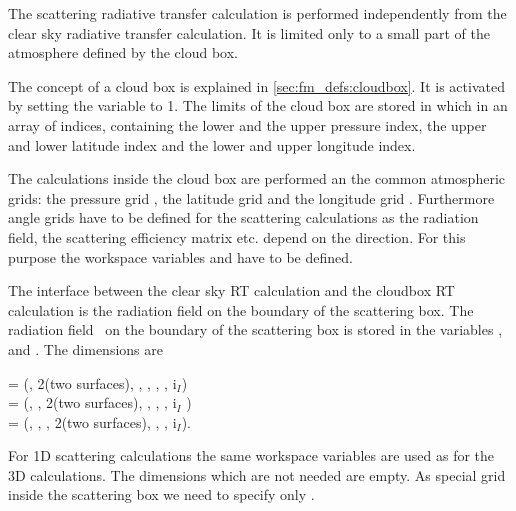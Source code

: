 \label{sec:scattering:scat_meth_rt}

The scattering radiative transfer calculation is performed
independently from the clear sky radiative transfer calculation. It is
limited only to a small part of the atmosphere defined by the cloud box.

\label{sec:scattering:cloudbox}


The concept of a cloud box is explained in
\ref{sec:fm_defs:cloudbox}. It is activated by setting the variable
 to 1. The
limits of the cloud box are stored in 
which in an array of indices, containing the lower and the upper
pressure index, the upper and lower latitude index and the lower and
upper longitude index. 

The calculations inside the cloud box are performed an the common 
atmospheric grids: the pressure grid
, the latitude grid  
and the longitude grid . 
Furthermore angle grids have to be defined for the scattering calculations  
as the radiation field, the scattering efficiency matrix etc. depend
on the direction. For this purpose  the workspace  
variables  and 
have to be defined.

The interface between the clear sky RT calculation and the cloudbox RT
calculation is the radiation field on the boundary of the scattering
box. The radiation field \StoVec\ on the boundary of the scattering box is stored
in the variables ,  and
. The dimensions are 
\begin{center}
   =  (\Frq, 2(two surfaces), \Lat, \Lon, \ScaZa, \ScaAa, i$_I$)\\
  =  (\Frq, \Prs, 2(two surfaces), \Lon, \ScaZa,
\ScaAa, i$_I$ )\\
  =  (\Frq, \Prs, \Lat, 2(two surfaces), \ScaZa,
\ScaAa, i$_I$).
\end{center}

For 1D scattering calculations the same workspace variables are 
used as for the 3D calculations. The dimensions which are not needed are empty. 
As special grid inside the scattering box we need to specify only  
. 

